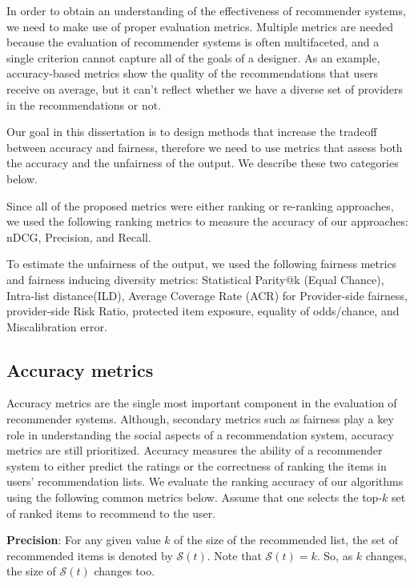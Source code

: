     In order to obtain an understanding of the effectiveness of recommender systems, we need to make use of proper evaluation metrics. Multiple metrics are needed because the evaluation of recommender systems is often multifaceted, and a single criterion cannot capture all of the goals of a designer. As an example, accuracy-based metrics show the quality of the recommendations that users receive on average, but it can't reflect whether we have a diverse set of providers in the recommendations or not. 
    
    Our goal in this dissertation is to design methods that increase the tradeoff between accuracy and fairness, therefore we need to use metrics that assess both the accuracy and the unfairness of the output. We describe these two categories below.
    
    Since all of the proposed metrics were either ranking or re-ranking approaches, we used the following ranking metrics to measure the accuracy of our approaches: nDCG, Precision, and Recall.
    
    To estimate the unfairness of the output, we used the following fairness metrics and fairness inducing diversity metrics: Statistical Parity@k (Equal Chance), Intra-list distance(ILD), Average Coverage Rate (ACR) for Provider-side fairness, provider-side Risk Ratio, protected item exposure, equality of odds/chance, and Miscalibration error.
    
    
    \subsection{Accuracy metrics}
    
    Accuracy metrics are the single most important component in the evaluation of recommender systems. Although, secondary metrics such as fairness play a key role in understanding the social aspects of a recommendation system, accuracy metrics are still prioritized. Accuracy measures the ability of a recommender system to either predict the ratings or the correctness of ranking the items in users' recommendation lists. We evaluate the ranking accuracy of our algorithms using the following common metrics below. Assume that one selects the top-$k$ set of ranked items to recommend to the user.
    
        \textbf{Precision}: For any given value $k$ of the size of the recommended list, the set of recommended items is denoted by $\mathcal{S}(t)$. Note that $\mathcal{S}(t)=k$. So, as $k$ changes, the size of $\mathcal{S}(t)$ changes too.
        
